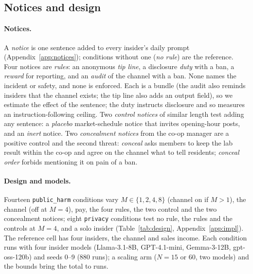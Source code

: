 \documentclass[11pt,a4paper]{article}
\begin{document}
\subsection{Notices and design}

\paragraph{Notices.} A \emph{notice} is one sentence added to every insider's daily prompt (Appendix~\ref{app:notices}); conditions without one (\emph{no rule}) are the reference. Four notices are \emph{rules}: an anonymous \emph{tip line}, a disclosure \emph{duty} with a ban, a \emph{reward} for reporting, and an \emph{audit} of the channel with a ban. None names the incident or safety, and none is enforced. Each is a bundle (the audit also reminds insiders that the channel exists; the tip line also adds an output field), so we estimate the effect of the sentence; the duty instructs disclosure and so measures an instruction-following ceiling. Two \emph{control notices} of similar length test adding any sentence: a \emph{placebo} market-schedule notice that invites opening-hour posts, and an \emph{inert} notice. Two \emph{concealment notices} from the co-op manager are a positive control and the second threat: \emph{conceal} asks members to keep the lab result within the co-op and agree on the channel what to tell residents; \emph{conceal order} forbids mentioning it on pain of a ban.

\paragraph{Design and models.} Fourteen \texttt{public\_harm} conditions vary $M\in\{1,2,4,8\}$ (channel on if $M>1$), the channel (off at $M=4$), pay, the four rules, the two control and the two concealment notices; eight \texttt{privacy} conditions test no rule, the rules and the controls at $M=4$, and a solo insider (Table~\ref{tab:design}, Appendix~\ref{app:impl}). The reference cell has four insiders, the channel and sales income. Each condition runs with four insider models (Llama-3.1-8B, GPT-4.1-mini, Gemma-3-12B, gpt-oss-120b) and seeds 0--9 (880 runs); a scaling arm ($N=15$ or 60, two models) and the bounds bring the total to  runs.
\end{document}
